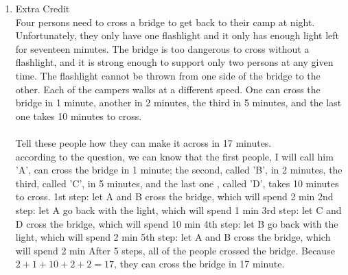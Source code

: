 \documentclass{article}
\theoremstyle{definition}
\theoremstyle{plain}
\begin{document}
\begin {enumerate}[itemindent=30pt,label=\bf Exercise {\arabic*}:]
\\
\subitem \;\;\;\;$LHS = m^4 -1$
\subitem \;\;\;\;$RHS = m^4 + m^2 - m^2 -1 = m^4 - 1$
\subitem \;\;\;\;$\because LHS = RHS$
\subitem \;\;\;\;$\therefore$ This identity is true.
\\
\item Extra Credit
\\Four persons need to cross a bridge to get back to their camp at night. 
Unfortunately, they only have one flashlight and it only has enough light left for seventeen minutes. The bridge is too dangerous to cross without a flashlight, and it is strong enough to support only two persons at any given time. The flashlight cannot be thrown from one side of the bridge to the other. Each of the campers walks at a different speed. One can cross the bridge in 1 minute, another in 2 minutes, the third in 5 minutes, and the last one takes 10 minutes to cross.
\\
\\
Tell these people how they can make it across in 17 minutes.
\\
\subitem according to the question, we can know that the first people, I will call him 'A', can cross the bridge in 1 minute; the second, called 'B', in 2 minutes, the third, called 'C', in 5 minutes, and the last one , called 'D', takes 10 minutes to cross.
\subitem 1st step: let A and B cross the bridge, which will spend 2 min
\subitem 2nd step: let A go back with the light, which will spend 1 min
\subitem 3rd step: let C and D cross the bridge, which will spend 10 min
\subitem 4th step: let B go back with the light, which will spend 2 min
\subitem 5th step: let A and B cross the bridge, which will spend 2 min
\subitem After 5 steps, all of the people crossed the bridge. Because $2+1+10+2+2 = 17$, they can cross the bridge in 17 minute.

\end{enumerate}
\
\end{document}
